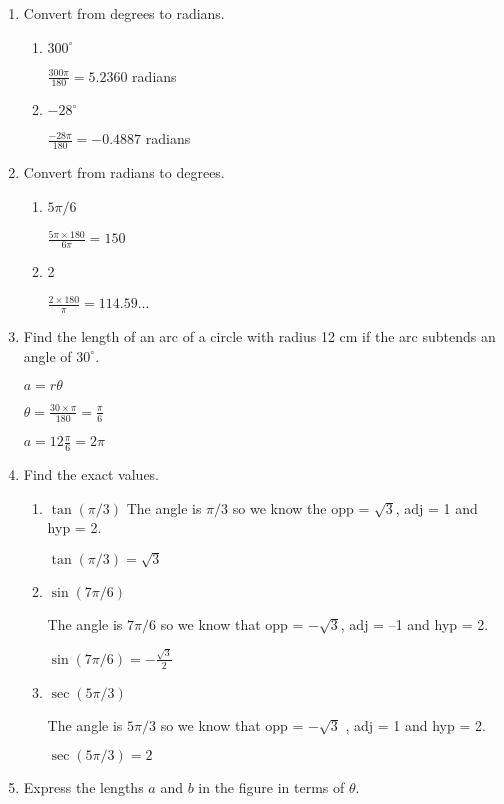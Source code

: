 \documentclass{article}
\begin{document}
\begin{enumerate}
	\item Convert from degrees to radians.
	\begin{enumerate}
		\item $300^{\circ}$

			$\frac{300\pi}{180} = 5.2360$ radians
		\item $ - 28^{\circ}$

			$\frac{-28\pi}{180} = -0.4887$ radians
	\end{enumerate}
	\item Convert from radians to degrees.

	\begin{enumerate}
		\item $5\pi / 6$

			$\frac{5 \pi \times 180}{6\pi} = 150$

		\item 2

			$\frac{2 \times 180}{\pi} = 114.59...$
	\end{enumerate}

	\item Find the length of an arc of a circle with radius 12 cm if the arc subtends an angle of $30^{\circ}$.

		$a = r\theta$
		
		$\theta = \frac{30 \times \pi}{180} = \frac{\pi}{6}$

		$a = 12\frac{\pi}{6} = 2\pi$

	\item Find the exact values.
	\begin{enumerate}
		\item $\tan(\pi/3)$
			The angle is $\pi/3$ so we know the opp = $\sqrt{3}$, adj = 1 and hyp = 2.
			
			$\tan(\pi/3) = \sqrt{3}$

		\item $\sin(7\pi/6)$

			The angle is $7\pi/6$ so we know that opp = $-\sqrt{3}$, adj = --1 and hyp = 2.

			$\sin(7\pi/6) = -\frac{\sqrt{3}}{2}$

		\item $\sec(5\pi/3)$

			The angle is $5\pi/3$ so we know that opp = $-\sqrt{3}$ , adj = 1 and hyp = 2.

			$\sec(5\pi/3) = 2$
	\end{enumerate}

		\item Express the lengths $a$ and $b$ in the figure in terms of $\theta$.


\end{enumerate}
\end{document}
